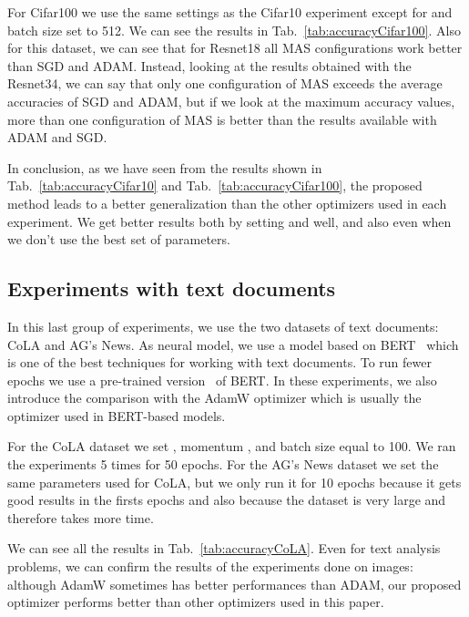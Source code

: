 \documentclass[10pt,twocolumn,letterpaper]{article}
\begin{document}
For Cifar100 we use the same settings as the Cifar10 experiment except for  and batch size set to 512.
We can see the results in Tab.~\ref{tab:accuracyCifar100}.
Also for this dataset, we can see that for Resnet18 all MAS configurations work better than SGD and ADAM.
Instead, looking at the results obtained with the Resnet34, we can say that only one configuration of MAS exceeds the average accuracies of SGD and ADAM, but if we look at the maximum accuracy values, more than one configuration of MAS is better than the results available with ADAM and SGD.

In conclusion, as we have seen from the results shown in Tab.~\ref{tab:accuracyCifar10} and Tab.~\ref{tab:accuracyCifar100}, the proposed method leads to a better generalization than the other optimizers used in each experiment.
We get better results both by setting  and  well, and also even when we don't use the best set of parameters.

\subsection{Experiments with text documents}






In this last group of experiments, we use the two datasets of text documents: CoLA and AG's News.
As neural model, we use a model based on BERT~\cite{devlin2018bert} which is one of the best techniques for working with text documents.
To run fewer epochs we use a pre-trained version~\cite{bert_pretrained} of BERT.
In these experiments, we also introduce the comparison with the AdamW optimizer which is usually the optimizer used in BERT-based models.

For the CoLA dataset we set , momentum , and batch size equal to 100. We ran the experiments 5 times for 50 epochs.
For the AG's News dataset we set the same parameters used for CoLA, but we only run it for 10 epochs because it gets good results in the firsts epochs and also because the dataset is very large and therefore takes more time.

We can see all the results in Tab.~\ref{tab:accuracyCoLA}.
Even for text analysis problems, we can confirm the results of the experiments done on images: although AdamW sometimes has better performances than ADAM, our proposed optimizer performs better than other optimizers used in this paper.
\end{document}
